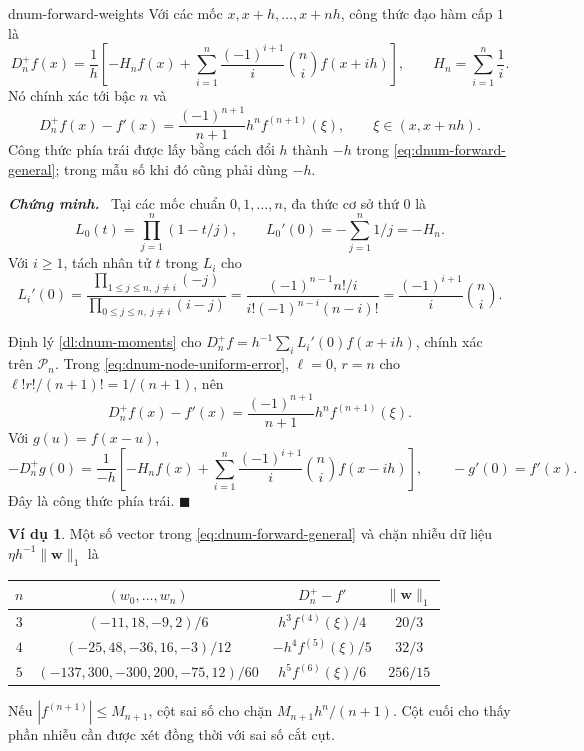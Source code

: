 \documentclass[12pt,a4paper,oneside]{book}
\numberwithin{algorithm}{chapter}
\theoremstyle{definition}
\newtheorem{vidu}{Ví dụ}[chapter]
\newenvironment{chungminh}{\par\medskip\noindent\textbf{\textit{\color{mainblue}Chứng minh.}}\ }{\hfill$\blacksquare$\par\medskip}
\begin{document}
\begin{menhde}{}{dnum-forward-weights}
Với các mốc $x,x+h,\ldots,x+nh$, công thức đạo hàm cấp $1$ là
\begin{equation}\label{eq:dnum-forward-general}
 D_n^+f(x)=\frac1h\left[-H_nf(x)+\sum_{i=1}^n\frac{(-1)^{i+1}}i\binom ni f(x+ih)\right],
 \qquad H_n=\sum_{i=1}^n\frac1i.
\end{equation}
Nó chính xác tới bậc $n$ và
\[
 D_n^+f(x)-f'(x)=\frac{(-1)^{n+1}}{n+1}h^nf^{(n+1)}(\xi),\qquad\xi\in(x,x+nh).
\]
Công thức phía trái được lấy bằng cách đổi $h$ thành $-h$ trong \eqref{eq:dnum-forward-general}; trong mẫu số khi đó cũng phải dùng $-h$.
\end{menhde}
\begin{chungminh}
Tại các mốc chuẩn $0,1,\ldots,n$, đa thức cơ sở thứ $0$ là
\[
 L_0(t)=\prod_{j=1}^n(1-t/j),\qquad L_0'(0)=-\sum_{j=1}^n1/j=-H_n.
\]
Với $i\geq1$, tách nhân tử $t$ trong $L_i$ cho
\[
 L_i'(0)=\frac{\prod_{1\leq j\leq n,\ j\ne i}(-j)}{\prod_{0\leq j\leq n,\ j\ne i}(i-j)}
 =\frac{(-1)^{n-1}n!/i}{i!(-1)^{n-i}(n-i)!}
 =\frac{(-1)^{i+1}}i\binom ni.
\]

Định lý \ref{dl:dnum-moments} cho $D_n^+f=h^{-1}\sum_iL_i'(0)f(x+ih)$, chính xác trên $\mathcal P_n$. Trong \eqref{eq:dnum-node-uniform-error}, $\ell=0$, $r=n$ cho $\ell!r!/(n+1)!=1/(n+1)$, nên
\[
 D_n^+f(x)-f'(x)=\frac{(-1)^{n+1}}{n+1}h^nf^{(n+1)}(\xi).
\]
Với $g(u)=f(x-u)$,
\[
 -D_n^+g(0)
 =\frac1{-h}\left[-H_nf(x)+\sum_{i=1}^n\frac{(-1)^{i+1}}i\binom ni f(x-ih)\right],
 \qquad -g'(0)=f'(x).
\]
Đây là công thức phía trái.
\end{chungminh}

\begin{vidu}
Một số vector trong \eqref{eq:dnum-forward-general} và chặn nhiễu dữ liệu $\eta h^{-1}\|\boldsymbol w\|_1$ là
\begin{center}\small
\begin{tabular}{c|c|c|c}
\toprule
$n$ & $(w_0,\ldots,w_n)$ & $D_n^+-f'$ & $\|\boldsymbol w\|_1$\\
\midrule
$3$ & $(-11,18,-9,2)/6$ & $h^3f^{(4)}(\xi)/4$ & $20/3$\\
$4$ & $(-25,48,-36,16,-3)/12$ & $-h^4f^{(5)}(\xi)/5$ & $32/3$\\
$5$ & $(-137,300,-300,200,-75,12)/60$ & $h^5f^{(6)}(\xi)/6$ & $256/15$\\
\bottomrule
\end{tabular}\end{center}
Nếu $|f^{(n+1)}|\leq M_{n+1}$, cột sai số cho chặn $M_{n+1}h^n/(n+1)$. Cột cuối cho thấy phần nhiễu cần được xét đồng thời với sai số cắt cụt.
\end{vidu}
\end{document}
